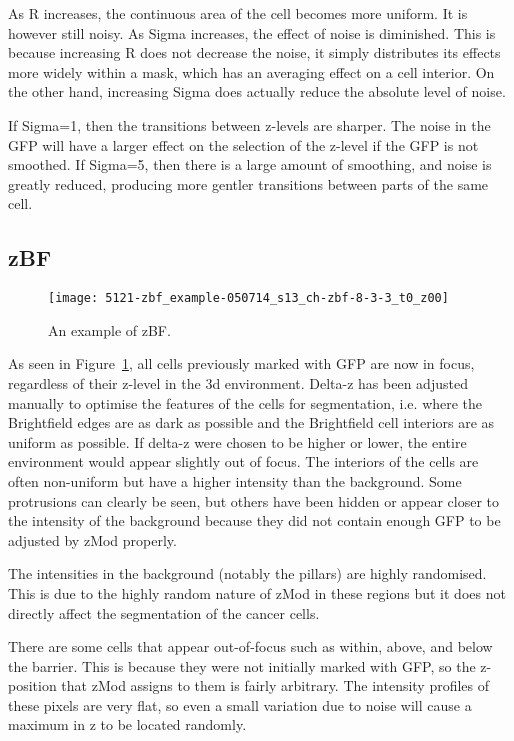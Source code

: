 As R increases, the continuous area of the cell becomes more uniform. It is however still noisy. As Sigma increases, the effect of noise is diminished. This is because increasing R does not decrease the noise, it simply distributes its effects more widely within a mask, which has an averaging effect on a cell interior. On the other hand, increasing Sigma does actually reduce the absolute level of noise.

If Sigma=1, then the transitions between z-levels are sharper. The noise in the GFP will have a larger effect on the selection of the z-level if the GFP is not smoothed. If Sigma=5, then there is a large amount of smoothing, and noise is greatly reduced, producing more gentler transitions between parts of the same cell.

\subsection{zBF}

\begin{figure}[htbp!]
\centering
\texttt{[image: 5121-zbf\_example-050714\_s13\_ch-zbf-8-3-3\_t0\_z00]}
\caption{An example of zBF.}
\label{fig:zbf_example}
\end{figure}

As seen in Figure~\ref{fig:zbf_example}, all cells previously marked with GFP are now in focus, regardless of their z-level in the 3d environment. Delta-z has been adjusted manually to optimise the features of the cells for segmentation, i.e. where the Brightfield edges are as dark as possible and the Brightfield cell interiors are as uniform as possible. If delta-z were chosen to be higher or lower, the entire environment would appear slightly out of focus. The interiors of the cells are often non-uniform but have a higher intensity than the background. Some protrusions can clearly be seen, but others have been hidden or appear closer to the intensity of the background because they did not contain enough GFP to be adjusted by zMod properly.

The intensities in the background (notably the pillars) are highly randomised. This is due to the highly random nature of zMod in these regions but it does not directly affect the segmentation of the cancer cells.

There are some cells that appear out-of-focus such as within, above, and below the barrier. This is because they were not initially marked with GFP, so the z-position that zMod assigns to them is fairly arbitrary. The intensity profiles of these pixels are very flat, so even a small variation due to noise will cause a maximum in z to be located randomly.

